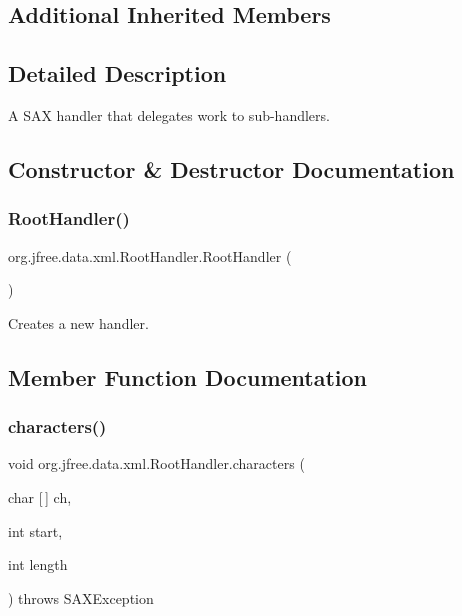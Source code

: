 \subsection*{Additional Inherited Members}


\subsection{Detailed Description}
A S\+AX handler that delegates work to sub-\/handlers. 

\subsection{Constructor \& Destructor Documentation}
\mbox{\label{classorg_1_1jfree_1_1data_1_1xml_1_1_root_handler_aa69b89ba3c1180322b5ce33c23e64574}} 
\subsubsection{\texorpdfstring{Root\+Handler()}{RootHandler()}}
{\footnotesize\ttfamily org.\+jfree.\+data.\+xml.\+Root\+Handler.\+Root\+Handler (\begin{DoxyParamCaption}{ }\end{DoxyParamCaption})}

Creates a new handler. 

\subsection{Member Function Documentation}
\mbox{\label{classorg_1_1jfree_1_1data_1_1xml_1_1_root_handler_a7a853466d5780ea87c1b3316ccddd294}} 
\subsubsection{\texorpdfstring{characters()}{characters()}}
{\footnotesize\ttfamily void org.\+jfree.\+data.\+xml.\+Root\+Handler.\+characters (\begin{DoxyParamCaption}\item[{char \mbox{[}$\,$\mbox{]}}]{ch,  }\item[{int}]{start,  }\item[{int}]{length }\end{DoxyParamCaption}) throws S\+A\+X\+Exception}

